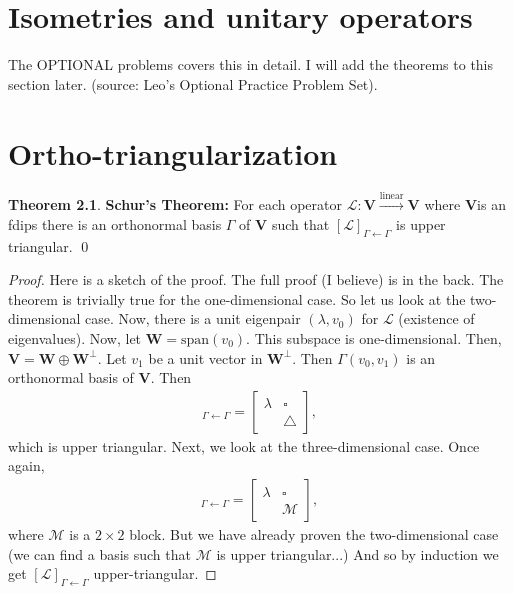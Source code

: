 \documentclass{book}
\theoremstyle{definition}
\newtheorem{thm}{Theorem}[section]
\newcommand{\V}{\mathbf{V}}
\newcommand{\W}{\mathbf{W}}
\newcommand{\xpan}{\text{span}}
\newcommand{\lag}{\mathcal{L}}
\newcommand{\M}{\mathcal{M}}
\newcommand{\lin}{\overset{\text{linear}}{\longrightarrow}}
\begin{document}
\newpage

\chapter{Isometries and unitary operators}

The OPTIONAL problems covers this in detail. I will add the theorems to this section later. (source: Leo's Optional Practice Problem Set).

\newpage 

\chapter{Ortho-triangularization}

\begin{thm}\textbf{Schur's Theorem:} 
	For each operator $\lag : \V \lin \V$ where $\V$is an fdips there is an orthonormal basis $\Gamma$ of $\V$ such that $[\lag]_{\Gamma\leftarrow\Gamma}$ is upper triangular. \qed
\end{thm}


\begin{proof}
	Here is a sketch of the proof. The full proof (I believe) is in the back. The theorem is trivially true for the one-dimensional case. So let us look at the two-dimensional case. Now, there is a unit eigenpair $(\lambda,v_0)$ for $\lag$ (existence of eigenvalues). Now, let $\W = \xpan(v_0)$. This subspace is one-dimensional. Then, $\V = \W \oplus \W^\perp$. Let $v_1$ be a unit vector in $\W^\perp$. Then $\Gamma(v_0, v_1)$ is an orthonormal basis of $\V$. Then
	\begin{align*}
	[\lag]_{\Gamma\leftarrow\Gamma} = \begin{bmatrix}
	\lambda & \square\\
	& \triangle
	\end{bmatrix},
	\end{align*}
	which is upper triangular. Next, we look at the three-dimensional case. Once again, 
	\begin{align*}
	[\lag]_{\Gamma\leftarrow\Gamma} = \begin{bmatrix}
	\lambda & \square\\
	& \M
	\end{bmatrix},
	\end{align*}
	where $\M$ is a $2\times 2$ block. But we have already proven the two-dimensional case (we can find a basis such that $\M$ is upper triangular...) And so by induction we get $[\lag]_{\Gamma\leftarrow\Gamma}$ upper-triangular. 
\end{proof}
\end{document}
